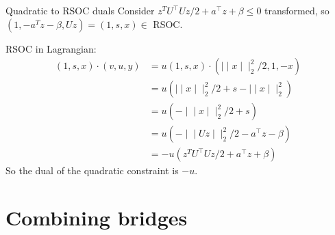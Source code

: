 \documentclass{beamer}
\def\lVert{\mid\!\mid}
\def\rVert{\mid\!\mid}
\begin{document}
\begin{frame}{Quadratic to RSOC duals}
  Consider $z^T U^\top U z/2 + a^\top z + \beta \le 0$ transformed,
  so $(1, -a^T z - \beta, Uz) = (1, s, x) \in {}$ RSOC.

  RSOC in Lagrangian:
  \begin{align*}
    (1, s, x) \cdot (v, u, y)
    & = u (1, s, x) \cdot (\lVert x \rVert_2^2/2, 1, -x)\\
    & = u (\lVert x \rVert_2^2/2 + s - \lVert x \rVert_2^2)\\
    & = u (-\lVert x \rVert_2^2/2 + s)\\
    & = u (-\lVert Uz \rVert_2^2/2 - a^\top z - \beta)\\
    & = -u (z^T U^\top U z/2 + a^\top z + \beta)
  \end{align*}
  So the dual of the quadratic constraint is $-u$.
\end{frame}

\section{Combining bridges}
\end{document}
